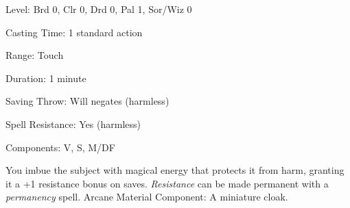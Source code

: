 
\begin{description*}
\item[Level:] Brd 0, Clr 0, Drd 0, Pal 1, Sor/Wiz 0
\item[Casting Time:] 1 standard action
\item[Range:] Touch
\item[Duration:] 1 minute
\item[Saving Throw:] Will negates (harmless)
\item[Spell Resistance:] Yes (harmless)
\item[Components:] V, S, M/DF
\end{description*}

You imbue the subject with magical energy that protects it from harm, granting
it a +1 resistance bonus on saves.
\textit{Resistance} can be made permanent with a \textit{permanency} spell.
Arcane Material Component: A miniature cloak.